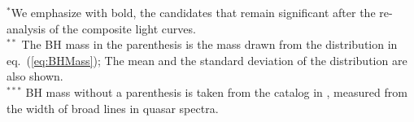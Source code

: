\begin{table}
\begin{tabular}{|c| c| c| c| c| c| c| c| c|}
\hline
\end{tabular}
\label{Table:CandidatesQuasarProperties}
\begin{flushleft}
$^{*}$We emphasize with bold, the candidates that remain significant after the re-analysis of the composite light curves.\\
$^{**}$ The BH mass in the parenthesis is the mass drawn from the distribution in eq.~(\ref{eq:BHMass}); The mean and the standard deviation of the distribution are also shown.\\
$^{***}$ BH mass without a parenthesis is taken from the catalog in \citet{2008ApJ...680..169S}, measured from the width of broad lines in quasar spectra.
\end{flushleft}

\end{table}


